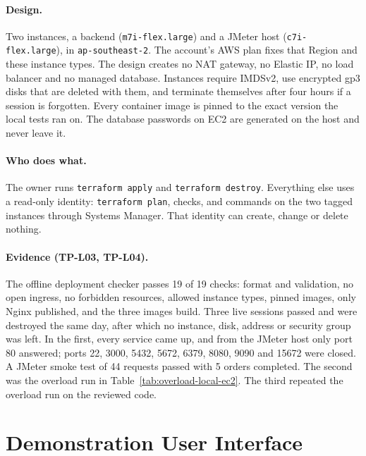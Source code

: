 \documentclass[a4paper]{report}
\begin{document}
\paragraph{Design.} Two instances, a backend (\texttt{m7i-flex.large}) and
a JMeter host (\texttt{c7i-flex.large}), in \texttt{ap-southeast-2}. The
account's AWS plan fixes that Region and these instance types. The design
creates no NAT gateway, no Elastic IP, no load balancer and no managed
database. Instances require IMDSv2, use encrypted gp3 disks that are deleted
with them, and terminate themselves after four hours if a session is
forgotten. Every container image is pinned to the exact version the local
tests ran on. The database passwords on EC2 are generated on the host and
never leave it.

\paragraph{Who does what.} The owner runs \texttt{terraform apply} and
\texttt{terraform destroy}. Everything else uses a read-only
identity: \texttt{terraform plan}, checks, and commands on the two tagged
instances through Systems Manager. That identity can create, change or delete
nothing.

\sloppy\paragraph{Evidence (TP-L03, TP-L04).} The offline deployment checker
passes 19 of 19 checks: format and
validation, no open ingress, no forbidden resources, allowed instance types,
pinned images, only Nginx published, and the three images build. Three live
sessions passed and were destroyed the same day, after which no instance,
disk, address or security group was left. In the first, every service came
up, and from the JMeter host only port 80 answered; ports 22, 3000, 5432,
5672, 6379, 8080, 9090 and 15672 were closed. A JMeter smoke test of 44
requests passed with 5 orders completed. The second was the overload run in
Table~\ref{tab:overload-local-ec2}. The third repeated the overload run on
the reviewed code.\par

\section{Demonstration User Interface}
\label{sec:demo-ui}
\end{document}
